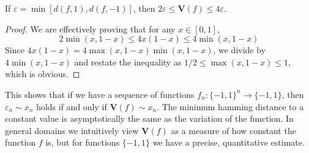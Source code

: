 \begin{lemma}
    If $\varepsilon = \min[d(f,1),d(f,-1)]$, then $2\varepsilon \leq \mathbf{V}(f) \leq 4\varepsilon$.
\end{lemma}
\begin{proof}
    We are effectively proving that for any $x \in [0,1]$,
    \[ 2\min(x,1-x) \leq 4x(1-x) \leq 4\min(x,1-x) \]
    Since $4x(1-x) = 4\max(x,1-x)\min(x,1-x)$, we divide by $4\min(x,1-x)$ and restate the inequality as $1/2 \leq \max(x,1-x) \leq 1$, which is obvious.
\end{proof}

This shows that if we have a sequence of functions $f_n: \{ -1, 1 \}^n \to \{ -1, 1 \}$, then $\varepsilon_n \sim x_n$ holds if and only if $\mathbf{V}(f) \sim x_n$. The minimum hamming distance to a constant value is asymptotically the same as the variation of the function. In general domains we intuitively view $\mathbf{V}(f)$ as a measure of how constant the function $f$ is, but for functions $\{ -1, 1 \}$ we have a precise, quantitative estimate.


